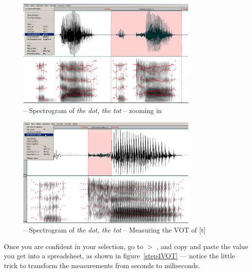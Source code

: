 \begin{figure}[!tbp]
\caption{\Praat{} -- Spectrogram of \emph{the dot, the tot} -- zooming in}
\label{step2VOT}
	\begin{center}
		\includegraphics[width=0.8\textwidth]{./figures/Part-C-VOT-thedotthetot-zoom}
	\end{center}
\end{figure}

\begin{figure}[!tbp]
\caption{\Praat{} -- Spectrogram of \emph{the dot, the tot} -- Measuring the VOT of [t]}
\label{step3VOT}
	\begin{center}
		\includegraphics[width=0.8\textwidth]{./figures/Part-C-VOT-thedotthetot-measuring-unvoiced}
	\end{center}
\end{figure}

Once you are confident in your selection, go to  $>$ , and copy and paste the value you get into a spreadsheet, as shown in figure~\ref{step4VOT} --- notice the little trick to transform the measurements from seconds to miliseconds.

